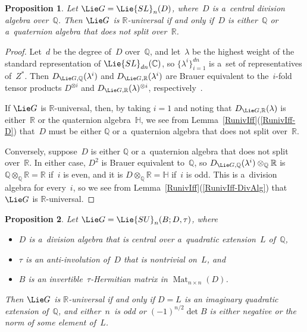 \documentclass[pdftex]{sigma}
\DeclareMathOperator{\Mat}{Mat}
\numberwithin{equation}{section}
\newtheorem{prop}{Proposition}[section]
\begin{document}
\begin{prop}
Let $\Lie G = \Lie{SL}_n(D)$, where~$D$ is a~central division algebra over~$\mathbb{Q}$.
Then $\Lie G$ is $\mathbb{R}$-universal if and only if~$D$ is either~$\mathbb{Q}$ or a~quaternion algebra that
does not split over~$\mathbb{R}$.
\end{prop}

\begin{proof}
Let~$d$ be the degree of~$D$ over~$\mathbb{Q}$, and let~$\lambda$ be the highest weight of the standard representation
of $\Lie{SL}_{dn}(\mathbb{C})$, so $\{\lambda^i\}_{i=1}^{dn}$ is a~set of representatives of~$Z^*$.
Then $D_{\Lie G,\mathbb{Q}}(\lambda^i)$ and $D_{\Lie G,\mathbb{R}}(\lambda^i)$ are Brauer equivalent to the~$i$-fold
tensor products $D^{\otimes i}$ and $D_{\Lie G, \mathbb{R}}(\lambda)^{\otimes i}$,
respectively~\cite[p.~378]{KnusEtAl-BookOfInvols}.

If $\Lie G$ is $\mathbb{R}$-universal, then, by taking $i = 1$ and noting that $D_{\Lie G,\mathbb{R}}(\lambda)$ is
either~$\mathbb{R}$ or the quaternion algebra~$\mathbb{H}$, we see from Lemma~\ref{RunivIff}(\ref{RunivIff-D}) that~$D$ must be
either $\mathbb{Q}$ or a~quaternion algebra that does not split over~$\mathbb{R}$.

Conversely, suppose~$D$ is either $\mathbb{Q}$ or a~quaternion algebra that does not split over~$\mathbb{R}$.
In either case, $D^2$ is Brauer equivalent to~$\mathbb{Q}$, so $D_{\Lie G,\mathbb{Q}}(\lambda^i) \otimes_\mathbb{Q}
\mathbb{R}$ is $\mathbb{Q} \otimes_\mathbb{Q} \mathbb{R} = \mathbb{R}$ if~$i$ is even, and it is $D \otimes_\mathbb{Q}
\mathbb{R} = \mathbb{H}$ if~$i$ is odd.
This is a~division algebra for every~$i$, so we see from Lemma~\ref{RunivIff}(\ref{RunivIff-DivAlg}) that $\Lie G$ is
$\mathbb{R}$-universal.
\end{proof}

\begin{prop}
Let $\Lie G = \Lie{SU}_n(B; D, \tau)$, where
\begin{itemize}\itemsep=0pt
\item $D$ is a~division algebra that is central over a~quadratic extension~$L$ of~$\mathbb{Q}$,
\item $\tau$ is an anti-involution of~$D$ that is nontrivial on~$L$, and
\item $B$ is an invertible~$\tau$-Hermitian matrix in $\Mat_{n\times n}(D)$.
\end{itemize}
Then $\Lie G$ is $\mathbb{R}$-universal if and only if $D = L$ is an imaginary quadratic extension
of~$\mathbb{Q}$, and either~$n$~is odd or $(-1)^{n/2} \det B$ is either negative or the norm of some element of~$L$.
\end{prop}
\end{document}
